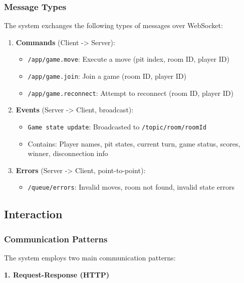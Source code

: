 \documentclass{scrartcl}
\begin{document}
\subsubsection{Message Types}

The system exchanges the following types of messages over WebSocket:

\begin{enumerate}
  \item \textbf{Commands} (Client -> Server):
  \begin{itemize}
    \item \texttt{/app/game.move}: Execute a move (pit index, room ID, player ID)
    \item \texttt{/app/game.join}: Join a game (room ID, player ID)
    \item \texttt{/app/game.reconnect}: Attempt to reconnect (room ID, player ID)
  \end{itemize}

  \item \textbf{Events} (Server -> Client, broadcast):
  \begin{itemize}
    \item \texttt{Game state update}: Broadcasted to \texttt{/topic/room/{roomId}}
    \item Contains: Player names, pit states, current turn, game status, scores, winner, disconnection info
  \end{itemize}

  \item \textbf{Errors} (Server -> Client, point-to-point):
  \begin{itemize}
    \item \texttt{/queue/errors}: Invalid moves, room not found, invalid state errors
  \end{itemize}
\end{enumerate}



\subsection{Interaction}\label{interaction}

\subsubsection{Communication Patterns}

The system employs two main communication patterns:

\textbf{1. Request-Response (HTTP)}
\end{document}
